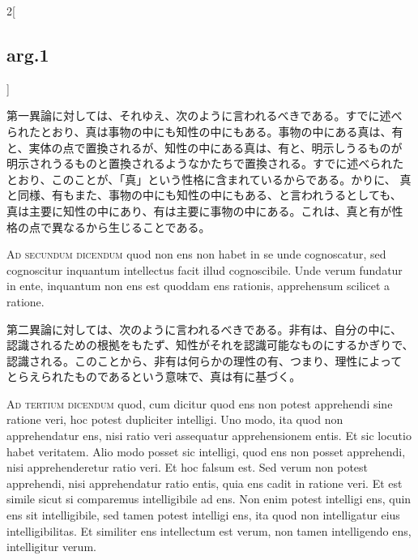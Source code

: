 \documentclass[paper=a4paper,fontsize=10pt,jafontsize=9pt,titlepage]{jlreq}
\begin{document}
\begin{paracol}{2}[\subsection{arg.1}]
\switchcolumn

第一異論に対しては、それゆえ、次のように言われるべきである。すでに述べ
られたとおり、真は事物の中にも知性の中にもある。事物の中にある真は、有
と、実体の点で置換されるが、知性の中にある真は、有と、明示しうるものが
明示されうるものと置換されるようなかたちで置換される。すでに述べられた
とおり、このことが、「真」という性格に含まれているからである。かりに、
真と同様、有もまた、事物の中にも知性の中にもある、と言われうるとしても、
真は主要に知性の中にあり、有は主要に事物の中にある。これは、真と有が性
格の点で異なるから生じることである。

\switchcolumn*[\subsection{ad.2}]


{\scshape Ad secundum dicendum} quod non ens non habet in se unde
cognoscatur, sed cognoscitur inquantum intellectus facit illud
cognoscibile. Unde verum fundatur in ente, inquantum non ens est
quoddam ens rationis, apprehensum scilicet a ratione.

\switchcolumn

第二異論に対しては、次のように言われるべきである。非有は、自分の中に、
認識されるための根拠をもたず、知性がそれを認識可能なものにするかぎりで、
認識される。このことから、非有は何らかの理性の有、つまり、理性によって
とらえられたものであるという意味で、真は有に基づく。

\switchcolumn*[\subsection{ad.3}]


{\scshape Ad tertium dicendum} quod, cum dicitur quod ens non potest
apprehendi sine ratione veri, hoc potest dupliciter intelligi. Uno
modo, ita quod non apprehendatur ens, nisi ratio veri assequatur
apprehensionem entis. Et sic locutio habet veritatem. Alio modo posset
sic intelligi, quod ens non posset apprehendi, nisi apprehenderetur
ratio veri. Et hoc falsum est. Sed verum non potest apprehendi, nisi
apprehendatur ratio entis, quia ens cadit in ratione veri. Et est
simile sicut si comparemus intelligibile ad ens. Non enim potest
intelligi ens, quin ens sit intelligibile, sed tamen potest intelligi
ens, ita quod non intelligatur eius intelligibilitas. Et similiter ens
intellectum est verum, non tamen intelligendo ens, intelligitur verum.

\switchcolumn


\end{paracol}
\end{document}
